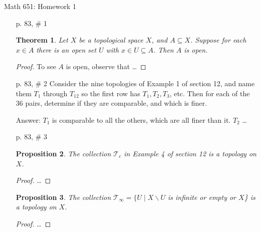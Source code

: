 \documentclass{report}
\date{August 24, 2018}
\newcommand{\duedate}[1]{#1}
\theoremstyle{plain}
\newtheorem{thm}{Theorem}
\newtheorem{prop}[thm]{Proposition}
\begin{document}
 

\rightline{\duedate{January 23, 2019}}

\centerline{\sc \large Math 651: Homework 1 }
\smallskip


\begin{itemize}

\item[p. 83, \# 1]  
\begin{thm}Let $X$ be a topological space $X$, and $A\subseteq X$. Suppose for each $x\in A$ there is an open set $U$ with $x\in U\subseteq A$.
Then $A$ is open.
\end{thm}
\begin{proof} To see $A$ is open, observe that \dots
\end{proof}

\item[p. 83, \# 2]  Consider  the nine topologies of Example 1 of section 12, and name them $T_1$ through $T_{12}$ so the first row has $T_1,T_2, T_3$, etc.
Then for each of the 36 pairs, determine if they are comparable, and which is finer.

Answer: $T_1$ is comparable to all the others, which are all finer than it. $T_2$ \dots


\item[p. 83, \# 3] 
\begin{prop} The collection $\mathcal T_c$ in Example 4 of section 12 is a topology on $X$.
\end{prop}
\begin{proof}\dots
\end{proof}
\begin{prop} The collection $\mathcal T_\infty=\{U\mid X\smallsetminus U$ is infinite or empty or $X$\} is a topology on $X$.
\end{prop}
\begin{proof}\dots
\end{proof}

\end{itemize}
\end{document}
